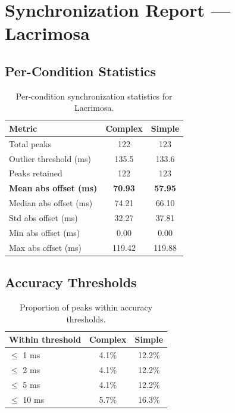 
\section*{Synchronization Report --- Lacrimosa}

\subsection*{Per-Condition Statistics}

\begin{table}[h!]
\centering
\begin{tabular}{|l|c|c|}
\hline
Metric & Complex & Simple \\
\hline
Total peaks & 122 & 123 \\
Outlier threshold (ms) & 135.5 & 133.6 \\
Peaks retained & 122 & 123 \\
\textbf{Mean abs offset (ms)} & \textbf{70.93} & \textbf{57.95} \\
Median abs offset (ms) & 74.21 & 66.10 \\
Std abs offset (ms) & 32.27 & 37.81 \\
Min abs offset (ms) & 0.00 & 0.00 \\
Max abs offset (ms) & 119.42 & 119.88 \\
\hline
\end{tabular}
\caption{Per-condition synchronization statistics for Lacrimosa.}
\label{tab:sync_stats}
\end{table}

\subsection*{Accuracy Thresholds}

\begin{table}[h!]
\centering
\begin{tabular}{|l|c|c|}
\hline
Within threshold & Complex & Simple \\
\hline
$\leq$ 1 ms & 4.1\% & 12.2\% \\
$\leq$ 2 ms & 4.1\% & 12.2\% \\
$\leq$ 5 ms & 4.1\% & 12.2\% \\
$\leq$ 10 ms & 5.7\% & 16.3\% \\
\hline
\end{tabular}
\caption{Proportion of peaks within accuracy thresholds.}
\label{tab:sync_accuracy}
\end{table}

